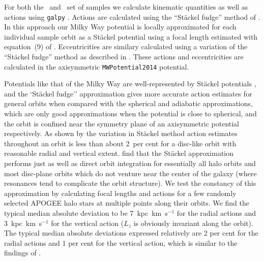 For both the \solar\ and \survey\ set of samples we calculate kinematic quantities as well as actions using \texttt{galpy} \parencite{bovy15}. Actions are calculated using the ``St\"{a}ckel fudge'' method of \textcite{binney12}. In this approach our Milky Way potential is locally approximated for each individual sample orbit as a St\"{a}ckel potential using a focal length estimated with equation~(9) of \textcite{sanders12}. Eccentricities are similary calculated using a variation of the ``St\"{a}ckel fudge'' method as described in \textcite{mackereth18c}. These actions and eccentricities are calculated in the axisymmetric \texttt{MWPotential2014} potential. 

Potentials like that of the Milky Way are well-represented by St\"{a}ckel potentials \parencite{dejonghe88}, and the `St\"{a}ckel fudge'' approximation gives more accurate action estimates for general orbits when compared with the spherical and adiabatic approximations, which are only good approximations when the potential is close to spherical, and the orbit is confined near the symmetry plane of an axisymmetric potential respectively. As shown by \parencite{bovy15} the variation in St\"{a}ckel method action estimates throughout an orbit is less than about 2~per cent for a disc-like orbit with reasonable radial and vertical extent. \textcite{mackereth18c} find that the St\"{a}ckel approximation performs just as well as direct orbit integration for essentially all halo orbits and most disc-plane orbits which do not venture near the center of the galaxy (where resonances tend to complicate the orbit structure). We test the constancy of this approximation by calculating focal lengths and actions for a few randomly selected APOGEE halo stars at multiple points along their orbits. We find the typical median absolute deviation to be 7~kpc~km~s$^{-1}$ for the radial actions and 3~kpc~km~s$^{-1}$ for the vertical action ($L_{z}$ is obviously invariant along the orbit). The typical median absolute deviations expressed relatively are 2 per cent for the radial actions and 1 per cent for the vertical action, which is similar to the findings of \textcite{bovy15}.


